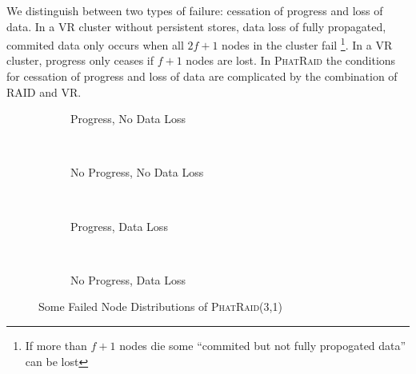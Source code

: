 \documentclass[10pt,letter]{article}
\newcommand{\phatraid}[0]{\textsc{PhatRaid}}
\newcommand{\phatraidcf}[2]{\textsc{PhatRaid}(#1,#2)}
\begin{document}
We distinguish between two types of failure: cessation of progress and loss of
data. In a VR cluster without persistent stores, data loss of fully propagated,
commited data only occurs when all $2f+1$ nodes in the cluster fail \footnote{If
  more than $f+1$ nodes die some ``commited but not fully propogated data'' can
  be lost}. In a VR cluster, progress only ceases if $f+1$ nodes are lost. In
\phatraid{} the conditions for cessation of progress and loss of data are
complicated by the combination of RAID and VR.

\begin{figure}
  \centering
  \begin{subfigure}{0.4\textwidth}
    \centering
    \caption{Progress, No Data Loss}
    \label{fig:failures_allok}
  \end{subfigure}
~
  \begin{subfigure}{0.4\textwidth}
    \centering
    \caption{No Progress, No Data Loss}
    \label{fig:failures_noprogress}
  \end{subfigure}
\\\vspace{1em}
  \begin{subfigure}{0.4\textwidth}
    \centering
    \caption{Progress, Data Loss}
    \label{fig:failures_impossible}
  \end{subfigure}
~
  \begin{subfigure}{0.4\textwidth}
    \centering
    \caption{No Progress, Data Loss}
    \label{fig:failures_noprogress_dataloss}
  \end{subfigure}

  \caption{Some Failed Node Distributions of \phatraidcf{3}{1}}
  \label{fig:failures}
\end{figure}
\end{document}
